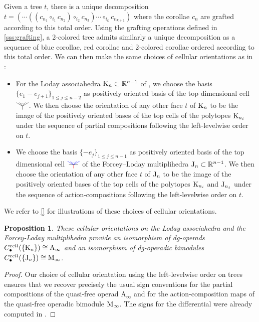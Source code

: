 \documentclass[twoside, 12pt]{amsart}
\newtheorem{proposition}[definition]{Proposition}
\theoremstyle{remark}
\begin{document}
Given a tree $t$, there is a unique decomposition $t=(\cdots ((c_{n_1} \circ_{i_1} c_{n_2})\circ_{i_2}c_{n_3})\cdots \circ_{i_k} c_{n_{k+1}})$ where the corollae $c_n$ are grafted according to this total order. Using the grafting operations defined in \cref{sss:grafting}, a 2-colored tree admits similarly a unique decomposition as a sequence of blue corollae, red corollae and 2-colored corollae ordered according to this total order. 
We can then make the same choices of cellular orientations as in \cite[I, Section 4]{Mazuir21} :
\begin{itemize}
  \item For the Loday associahedra $\mathrm{K}_n \subset \mathbb{R}^{n-1}$ of \cite{MTTV19}, we choose the basis $\{e_1 - e_{j+1}\}_{1\leq j \leq n-2}$ as positively oriented basis of the top dimensional cell $\arbreop{0.15}$. We then choose the orientation of any other face $t$ of $\mathrm{K}_n$ to be the image of the positively oriented bases of the top cells of the polytopes $\mathrm{K}_{n_i}$ under the sequence of partial compositions following the left-levelwise order on $t$. 
  \item We choose the basis $\{- e_j\}_{1\leq j \leq n-1}$ as positively oriented basis of the top dimensional cell $\arbreopmorph{0.15}$ of the Forcey--Loday multiplihedra $\mathrm{J}_n \subset \mathbb{R}^{n-1}$. We then choose the orientation of any other face $t$ of $\mathrm{J}_n$ to be the image of the positively oriented bases of the top cells of the polytopes $\mathrm{K}_{n_i}$ and $\mathrm{J}_{n_j}$ under the sequence of action-compositions following the left-levelwise order on $t$.
\end{itemize}
We refer to \ref{} for illustrations of these choices of cellular orientations.

\begin{proposition} 
\label{prop:functoriality}
These cellular orientations on the Loday associahedra and the Forcey-Loday multiplihedra provide an isomorphism of dg-operads $C_\bullet^{cell}(\{\mathrm{K}_n\})\cong \mathrm{A}_\infty$ and an isomorphism of dg-operadic bimodules $C_\bullet^{cell}(\{\mathrm{J}_n\})\cong \mathrm{M}_\infty$. 
\end{proposition}

\begin{proof}
Our choice of cellular orientation using the left-levelwise order on trees ensures that we recover precisely the usual sign conventions for the partial compositions of the quasi-free operad $\mathrm{A}_\infty$ and for the action-composition maps of the quasi-free operadic bimodule $\mathrm{M}_\infty$. 
The signs for the differential were already computed in \cite[I, Section 4]{Mazuir21}.
\end{proof}
\end{document}

